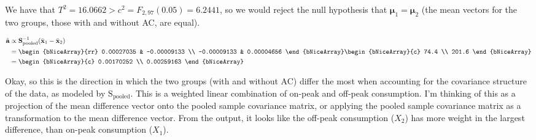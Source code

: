 We have that $T^{{2}} = 16.0662 > c^{2} = F_{2, 97}(0.05) = 6.2441$, so we would reject the null hypothesis that
$\bm{\mu}_{1} = \bm{\mu}_{2}$ (the mean vectors for the two groups, those with and without AC, are equal).

\begin{align*}
    \hat{\textbf{a}}
    & \propto
    \textbf{S}^{-1}_{\text{pooled}}
    (\bar{\textbf{x}}_{1} - \bar{\textbf{x}}_{2}) \\
    & =
    \begin{bNiceArray}{rr}
         0.00027035 & -0.00009133 \\
        -0.00009133 &  0.00004656
    \end{bNiceArray}
    \begin{bNiceArray}{c}
         74.4 \\
        201.6
    \end{bNiceArray} \\
    & =
    \begin{bNiceArray}{c}
        0.00170252 \\
        0.00259163
   \end{bNiceArray}
\end{align*}

Okay, so this is the direction in which the two groups (with and without AC) differ the most when accounting for the covariance structure of the data, as modeled by $\text{S}_{\text{pooled}}$.
This is a weighted linear combination of on-peak and off-peak consumption.
I'm thinking of this as a projection of the mean difference vector onto the pooled sample covariance matrix,
or applying the pooled sample covariance matrix as a transformation to the mean difference vector.
From the output, it looks like the off-peak consumption ($X_{2}$) has more weight in the largest difference, than on-peak consumption ($X_{1}$).